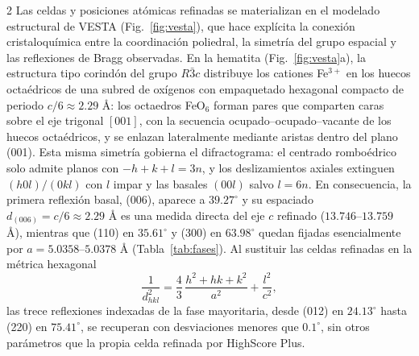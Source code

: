 \documentclass{article}
\begin{document}
\begin{multicols}{2}
Las celdas y posiciones atómicas refinadas se materializan en el modelado estructural de VESTA (Fig.~\ref{fig:vesta}), que hace explícita la conexión cristaloquímica entre la coordinación poliedral, la simetría del grupo espacial y las reflexiones de Bragg observadas. En la hematita (Fig.~\ref{fig:vesta}a), la estructura tipo corindón del grupo $R\bar{3}c$ distribuye los cationes Fe$^{3+}$ en los huecos octaédricos de una subred de oxígenos con empaquetado hexagonal compacto de periodo $c/6 \approx 2.29$ \r{A}: los octaedros FeO$_6$ forman pares que comparten caras sobre el eje trigonal $[001]$, con la secuencia ocupado--ocupado--vacante de los huecos octaédricos, y se enlazan lateralmente mediante aristas dentro del plano (001). Esta misma simetría gobierna el difractograma: el centrado romboédrico solo admite planos con $-h+k+l=3n$, y los deslizamientos axiales extinguen $(h0l)/(0kl)$ con $l$ impar y las basales $(00l)$ salvo $l = 6n$. En consecuencia, la primera reflexión basal, (006), aparece a $39.27^{\circ}$ y su espaciado $d_{(006)} = c/6 \approx 2.29$ \r{A} es una medida directa del eje $c$ refinado ($13.746$--$13.759$ \r{A}), mientras que (110) en $35.61^{\circ}$ y (300) en $63.98^{\circ}$ quedan fijadas esencialmente por $a = 5.0358$--$5.0378$ \r{A} (Tabla~\ref{tab:fases}). Al sustituir las celdas refinadas en la métrica hexagonal
\begin{equation*}
    \frac{1}{d_{hkl}^2} = \frac{4}{3}\,\frac{h^2+hk+k^2}{a^2} + \frac{l^2}{c^2},
\end{equation*}
las trece reflexiones indexadas de la fase mayoritaria, desde (012) en $24.13^{\circ}$ hasta (220) en $75.41^{\circ}$, se recuperan con desviaciones menores que $0.1^{\circ}$, sin otros parámetros que la propia celda refinada por HighScore Plus.


\end{multicols}
\end{document}
